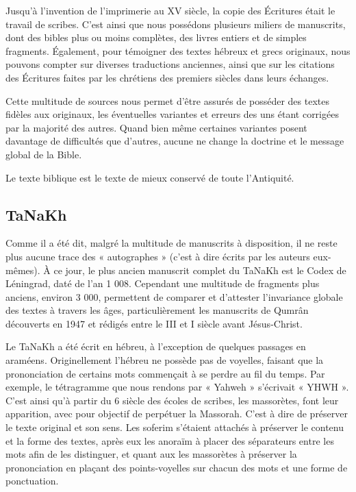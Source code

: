 \begin{small}
Jusqu'à l'invention de l'imprimerie au XV siècle, la copie des Écritures était le travail de scribes. C'est ainsi que nous possédons plusieurs miliers de manuscrits, dont des bibles plus ou moins complètes, des livres entiers et de simples fragments. Également, pour témoigner des textes hébreux et grecs originaux, nous pouvons compter sur diverses traductions anciennes, ainsi que sur les citations des Écritures faites par les chrétiens des premiers siècles dans leurs échanges.\bigskip

Cette multitude de sources nous permet d'être assurés de posséder des textes fidèles aux originaux, les éventuelles variantes et erreurs des uns étant corrigées par la majorité des autres. Quand bien même certaines variantes posent davantage de difficultés que d'autres, aucune ne change la doctrine et le message global de la Bible.\bigskip

Le texte biblique est le texte de mieux conservé de toute l'Antiquité.

\subsection*{TaNaKh}

Comme il a été dit, malgré la multitude de manuscrits à disposition, il ne reste plus aucune trace des « autographes » (c'est à dire écrits par les auteurs eux-mêmes). À ce jour, le plus ancien manuscrit complet du TaNaKh est le Codex de Léningrad, daté de l'an 1 008. Cependant une multitude de fragments plus anciens, environ 3 000, permettent de comparer et d'attester l'invariance globale des textes à travers les âges, particulièrement les manuscrits de Qumrân découverts en 1947 et rédigés entre le III et I siècle avant Jésus-Christ.\bigskip

Le TaNaKh a été écrit en hébreu, à l'exception de quelques passages en araméens. Originellement l'hébreu ne possède pas de voyelles, faisant que la prononciation de certains mots commençait à se perdre au fil du temps. Par exemple, le tétragramme que nous rendons par « Yahweh » s'écrivait « YHWH ». C'est ainsi qu'à partir du 6 siècle des écoles de scribes, les massorètes, font leur apparition, avec pour objectif de perpétuer la Massorah. C'est à dire de préserver le texte original et son sens. Les soferim s'étaient attachés à préserver le contenu et la forme des textes, après eux les anoraïm à placer des séparateurs entre les mots afin de les distinguer, et quant aux les massorètes à préserver la prononciation en plaçant des points-voyelles sur chacun des mots et une forme de ponctuation.\bigskip


\end{small}
